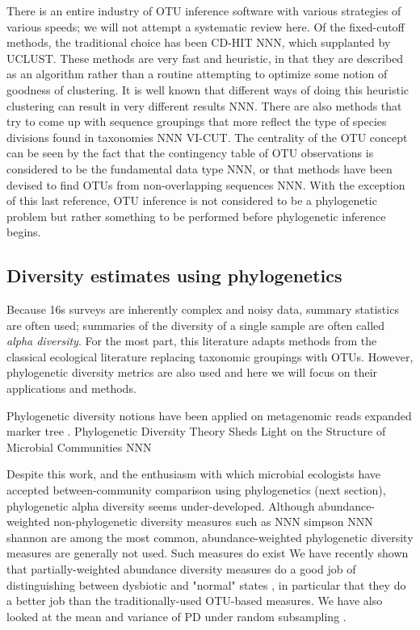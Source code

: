 \documentclass{amsart}
\begin{document}
There is an entire industry of OTU inference software with various strategies of various speeds; we will not attempt a systematic review here.
Of the fixed-cutoff methods, the traditional choice has been CD-HIT NNN, which supplanted by UCLUST.
These methods are very fast and heuristic, in that they are described as an algorithm rather than a routine attempting to optimize some notion of goodness of clustering.
It is well known that different ways of doing this heuristic clustering can result in very different results NNN.
There are also methods that try to come up with sequence groupings that more reflect the type of species divisions found in taxonomies NNN VI-CUT.
The centrality of the OTU concept can be seen by the fact that the contingency table of OTU observations is considered to be the fundamental data type NNN, or that methods have been devised to find OTUs from non-overlapping sequences NNN.
With the exception of this last reference, OTU inference is not considered to be a phylogenetic problem but rather something to be performed before phylogenetic inference begins.


\subsection{Diversity estimates using phylogenetics}
Because 16s surveys are inherently complex and noisy data, summary statistics are often used; summaries of the diversity of a single sample are often called \emph{alpha diversity}.
For the most part, this literature adapts methods from the classical ecological literature replacing taxonomic groupings with OTUs.
However, phylogenetic diversity metrics are also used and here we will focus on their applications and methods.

Phylogenetic diversity notions have been applied on metagenomic reads expanded marker tree \citep{kembel2011phylogenetic}.
Phylogenetic Diversity Theory Sheds Light on the Structure of Microbial Communities NNN \citep{odwyer2012phylogenetic}

Despite this work, and the enthusiasm with which microbial ecologists have accepted between-community comparison using phylogenetics (next section), phylogenetic alpha diversity seems under-developed.
Although abundance-weighted non-phylogenetic diversity measures such as NNN simpson NNN shannon are among the most common, abundance-weighted phylogenetic diversity measures are generally not used.
Such measures do exist \citep{chao2010phylogenetic}
We have recently shown that partially-weighted abundance diversity measures do a good job of distinguishing between dysbiotic and "normal" states \citep{mccoy2013abundance}, in particular that they do a better job than the traditionally-used OTU-based measures.
We have also looked at the mean and variance of PD under random subsampling \citep{nipperess2013mean}.
\end{document}
